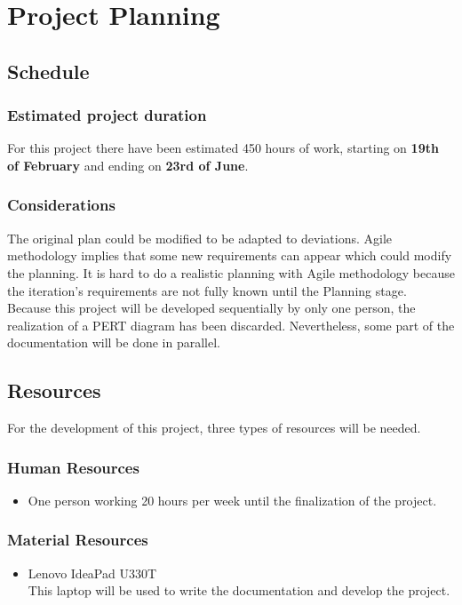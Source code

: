 \chapter{Project Planning}
\label{Chapter4}


\section{Schedule}
\subsection{Estimated project duration}
For this project there have been estimated 450 hours of work, starting on \textbf{19th of February} and ending on \textbf{23rd of June}.\\

\subsection{Considerations}
The original plan could be modified to be adapted to deviations. Agile methodology implies that some new requirements can appear which could modify the planning. It is hard to do a realistic planning with Agile methodology because the iteration's requirements are not fully known until the Planning stage.\\

Because this project will be developed sequentially by only one person, the realization of a PERT diagram has been discarded. Nevertheless, some part of the documentation will be done in parallel.

\section{Resources}
For the development of this project, three types of resources will be needed.
\subsection{Human Resources}
\begin{itemize}
	\item One person working 20 hours per week until the finalization of the project.
\end{itemize}
\subsection{Material Resources}
\begin{itemize}
	\item Lenovo IdeaPad U330T\\
	This laptop will be used to write the documentation and develop the project.
\end{itemize}
